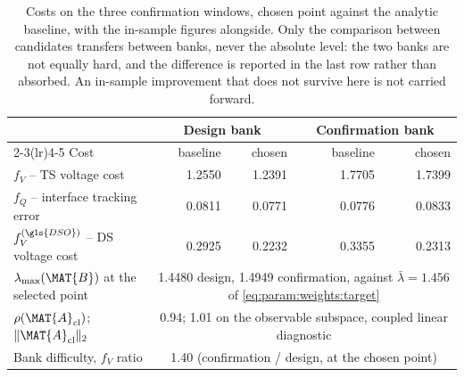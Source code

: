 \begin{table}[htbp]
	\centering
	\caption[Costs on the confirmation bank.]%
	{Costs on the three confirmation windows, chosen point against the analytic baseline, with the in-sample figures alongside.
		Only the comparison between candidates transfers between banks, never the absolute level: the two banks are not equally hard, and the difference is reported in the last row rather than absorbed.
		An in-sample improvement that does not survive here is not carried forward.}
	\label{tab:app_wsel:confirm}
	\small
	\begin{tabular}{l r r r r}
		\toprule
		& \multicolumn{2}{c}{Design bank} & \multicolumn{2}{c}{Confirmation bank} \\
		\cmidrule(lr){2-3}\cmidrule(lr){4-5}
		Cost & baseline & chosen & baseline & chosen \\
		\midrule
		$f_{V}$ -- \gls{TS} voltage cost          & \num{1.2550} & \num{1.2391} & \num{1.7705} & \num{1.7399} \\
		$f_{Q}$ -- interface tracking error        & \num{0.0811} & \num{0.0771} & \num{0.0776} & \num{0.0833} \\
		$f_{V}^{(\gls{DSO})}$ -- \gls{DS} voltage cost          & \num{0.2925} & \num{0.2232} & \num{0.3355} & \num{0.2313} \\
		\midrule
		$\lambda_{\max}(\MAT{B})$ at the selected point & \multicolumn{4}{c}{\num{1.4480} design, \num{1.4949} confirmation, against $\bar{\lambda}=\num{1.456}$ of \cref{eq:param:weights:target}} \\
		$\rho(\MAT{A}_{\mathrm{cl}})$; $\lVert\MAT{A}_{\mathrm{cl}}\rVert_{2}$ & \multicolumn{4}{c}{\num{0.94}; \num{1.01} on the observable subspace, coupled linear diagnostic} \\
		Bank difficulty, $f_{V}$ ratio            & \multicolumn{4}{c}{\num{1.40} (confirmation / design, at the chosen point)} \\
		\bottomrule
	\end{tabular}
\end{table}

